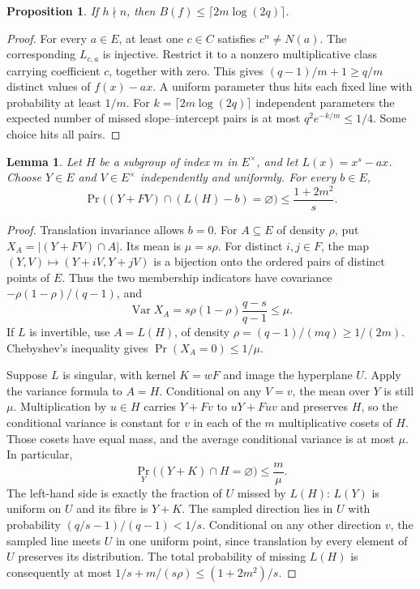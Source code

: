 \documentclass[preprint,12pt,numbers]{elsarticle}
\newtheorem{lemma}[theorem]{Lemma}
\newtheorem{proposition}[theorem]{Proposition}
\begin{document}
\begin{proposition}\label{prop:separated-upper}
If $h\nmid n$, then $B(f)\le\lceil 2m\log(2q)\rceil$.
\end{proposition}
\begin{proof}
For every $a\in E$, at least one $c\in C$ satisfies $c^n\ne N(a)$.
The corresponding $L_{c,a}$ is injective. Restrict it to a nonzero
multiplicative class carrying coefficient $c$, together with zero.
This gives $(q-1)/m+1\ge q/m$ distinct values of $f(x)-ax$.
A uniform parameter thus hits each fixed line with probability at least
$1/m$. For $k=\lceil 2m\log(2q)\rceil$ independent parameters the expected
number of missed slope--intercept pairs is at most $q^2e^{-k/m}\le1/4$.
Some choice hits all pairs.
\end{proof}

\begin{lemma}\label{lem:line-sampler}
Let $H$ be a subgroup of index $m$ in $E^\times$, and let
$L(x)=x^s-ax$. Choose $Y\in E$ and $V\in E^\times$ independently and
uniformly. For every $b\in E$,
\[
 \Pr\bigl((Y+FV)\cap (L(H)-b)=\varnothing\bigr)
 \le \frac{1+2m^2}{s}.
\]
\end{lemma}
\begin{proof}
Translation invariance allows $b=0$. For $A\subseteq E$ of density $\rho$,
put $X_A=|(Y+FV)\cap A|$. Its mean is $\mu=s\rho$.
For distinct $i,j\in F$, the map $(Y,V)\mapsto(Y+iV,Y+jV)$
is a bijection onto the ordered pairs of distinct points of $E$.
Thus the two membership indicators have covariance
$-\rho(1-\rho)/(q-1)$, and
\[
 \operatorname{Var}X_A=s\rho(1-\rho)\frac{q-s}{q-1}\le\mu .
\]
If $L$ is invertible, use $A=L(H)$, of density
$\rho=(q-1)/(mq)\ge1/(2m)$. Chebyshev's inequality gives
$\Pr(X_A=0)\le1/\mu$.

Suppose $L$ is singular, with kernel $K=wF$ and image the hyperplane
$U$. Apply the variance formula to $A=H$. Conditional on any $V=v$,
the mean over $Y$ is still $\mu$. Multiplication by $u\in H$ carries
$Y+Fv$ to $uY+Fuv$ and preserves $H$, so the conditional variance is
constant for $v$ in each of the $m$ multiplicative cosets of $H$.
Those cosets have equal mass, and the average conditional variance is
at most $\mu$. In particular,
\[
 \Pr_Y\bigl((Y+K)\cap H=\varnothing\bigr)
 \le \frac{m}{\mu}.
\]
The left-hand side is exactly the fraction of $U$ missed by $L(H)$:
$L(Y)$ is uniform on $U$ and its fibre is $Y+K$.
The sampled direction lies in $U$ with probability
$(q/s-1)/(q-1)<1/s$. Conditional on any other direction $v$, the sampled
line meets $U$ in one uniform point, since translation by every element
of $U$ preserves its distribution. The total probability of missing
$L(H)$ is consequently at most $1/s+m/(s\rho)\le(1+2m^2)/s$.
\end{proof}
\end{document}
